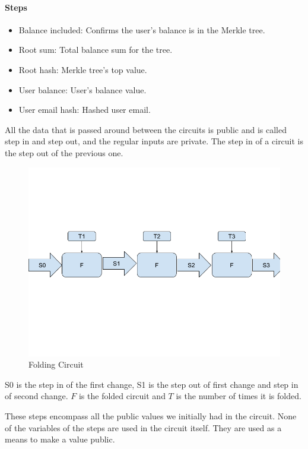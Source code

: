 \paragraph{Steps}
\begin{itemize}
   \item Balance included: Confirms the user's balance is in the Merkle tree.
   \item Root sum: Total balance sum for the tree.
   \item Root hash: Merkle tree's top value.
   \item User balance: User's balance value.
   \item User email hash: Hashed user email.
   \end{itemize}

All the data that is passed around between the circuits is public and is called step in and step out, and the regular inputs are private.
The step in of a circuit is the step out of the previous one.

\begin{figure}[H]
   \centering
   \includegraphics[width=130mm]{FoldingCircuit.png}
   \caption{Folding Circuit}
   \label{overflow}
   \end{figure}

S0 is the step in of the first change, S1 is the step out of first change and step in of second change. $F$ is the folded circuit
and $T$ is the number of times it is folded.

These steps encompass all the public values we initially had in the circuit.
None of the variables of the steps are used in the circuit itself. They are used as a means to make a value public.


